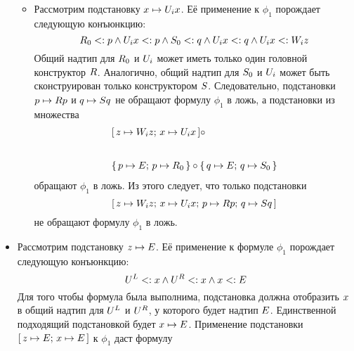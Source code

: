 \begin{proof*}
\begin{itemize}
\begin{itemize}
            \item
                Рассмотрим подстановку  $x \mapsto {U}_{i}x$. Её применение к  $\phi_{1}$ порождает следующую конъюнкцию:
                \[
                 {R}_{0} <: p \land {U}_{i}x <: p \land {S}_{0} <: q \land {U}_{i}x <: q \land {U}_{i}x <: {W}_{i}z
                \]
                Общий надтип для ${R}_{0}$ и ${U}_{i}$ может иметь только один головной конструктор ${R}$. Аналогично, общий надтип для  ${S}_{0}$ и ${U}_{i}$ может быть сконструирован только конструктором ${S}$. Следовательно, подстановки $p \mapsto {R}p$ и $q \mapsto {S}q$ не обращают формулу $\phi_{1}$ в ложь, а подстановки из множества
                \[
                    \begin{array}{l}
                        \textrm{[} \, z \mapsto {W}_{i}z; \, x \mapsto {U}_{i}x \, \textrm{]} \circ \\
                        [1em]\\
                        \lbrace \, p \mapsto {E}; \, p \mapsto {R}_{0} \, \rbrace \circ \lbrace \, q \mapsto {E}; \, q \mapsto {S}_{0} \, \rbrace
                    \end{array}
                \] обращают $\phi_1$ в ложь.
                Из этого следует, что только подстановки
                \[
                    \textrm{[} \, z \mapsto {W}_{i}z; \, x \mapsto {U}_{i}x; \, p \mapsto {R}p; \, q \mapsto {S}q \, \textrm{]}
                \] не обращают формулу $\phi_{1}$ в ложь.
        \end{itemize}
    \item
        Рассмотрим подстановку $z \mapsto {E}$. Её применение к формуле $\phi_{1}$ порождает следующую конъюнкцию:
        \[
         {U}^{L} <: x \land {U}^{R} <: x \land x <: {E}
        \]
        Для того чтобы формула была выполнима, подстановка должна отобразить $x$ в общий надтип для ${U}^{L}$ и ${U}^{R}$, у которого будет надтип ${E}$. Единственной подходящий подстановкой будет $x \mapsto {E}$. Применение подстановки $\textrm{[} \, z \mapsto {E}; \, x \mapsto {E} \, \textrm{]}$ к $\phi_{1}$ даст формулу
        \[
\]
\end{itemize}
\end{proof*}
